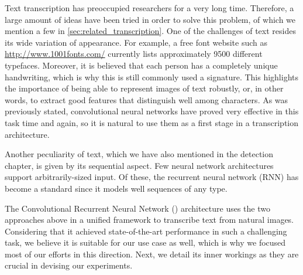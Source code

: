 
		Text transcription has preoccupied researchers for a very long time. Therefore, a large amount of ideas have been tried in order to solve this problem, of which we mention a few in \autoref{sec:related_transcription}. One of the challenges of text resides its wide variation of appearance. For example, a free font website such as \url{http://www.1001fonts.com/} currently lists approximately 9500 different typefaces. Moreover, it is believed that each person has a completely unique handwriting, which is why this is still commonly used a signature. This highlights the importance of being able to represent images of text robustly, or, in other words, to extract good features that distinguish well among characters. As was previously stated, convolutional neural networks have proved very effective in this task time and again, so it is natural to use them as a first stage in a transcription architecture.

		Another peculiarity of text, which we have also mentioned in the detection chapter, is given by its sequential aspect. Few neural network architectures support arbitrarily-sized input. Of these, the recurrent neural network (RNN) has become a standard since it models well sequences of any type.

		The Convolutional Recurrent Neural Network (\CRNN{}) architecture uses the two approaches above in a unified framework to transcribe text from natural images. Considering that it achieved state-of-the-art performance in such a challenging task, we believe it is suitable for our use case as well, which is why we focused most of our efforts in this direction. Next, we detail its inner workings as they are crucial in devising our experiments.


